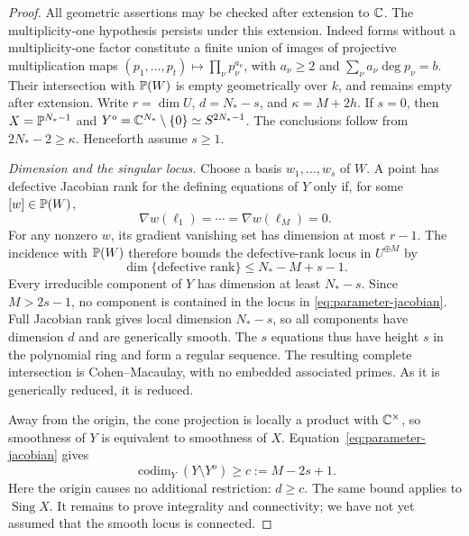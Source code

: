 \begin{proof}
All geometric assertions may be checked after extension to \(\mathbb C\).
The multiplicity-one hypothesis persists under this extension.
Indeed forms without a multiplicity-one factor constitute a finite
union of images of projective multiplication maps
\((p_1,\ldots,p_t)\mapsto\prod_\nu p_\nu^{a_\nu}\), with
\(a_\nu\ge2\) and \(\sum_\nu a_\nu\deg p_\nu=b\).
Their intersection with \(\mathbb P(W)\) is empty geometrically over \(k\),
and remains empty after extension.
Write \(r=\dim U\), \(d=N_*-s\), and \(\kappa=M+2h\).
If \(s=0\), then \(X=\mathbb P^{N_*-1}\) and
\(Y^o=\mathbb C^{N_*}\setminus\{0\}\simeq S^{2N_*-1}\).
The conclusions follow from \(2N_*-2\ge\kappa\).
Henceforth assume \(s\ge1\).

\emph{Dimension and the singular locus.}
Choose a basis \(w_1,\ldots,w_s\) of \(W\).  A point has defective
Jacobian rank for the defining equations of \(Y\) only if, for some
\([w]\in\mathbb P(W)\),
\[
 \nabla w(\ell_1)=\cdots=\nabla w(\ell_M)=0.
\]
For any nonzero \(w\), its gradient vanishing set has dimension at
most \(r-1\).  The incidence with \(\mathbb P(W)\) therefore bounds the
defective-rank locus in \(U^{\oplus M}\) by
\begin{equation}
 \dim\{\text{defective rank}\}\le N_*-M+s-1.
 \label{eq:parameter-jacobian}
\end{equation}
Every irreducible component of \(Y\) has dimension at least \(N_*-s\).
Since \(M>2s-1\), no component is contained in the locus in
\eqref{eq:parameter-jacobian}.  Full Jacobian rank gives local dimension
\(N_*-s\), so all components have dimension \(d\) and are generically
smooth.  The \(s\) equations thus have height \(s\) in the polynomial
ring and form a regular sequence.  The resulting complete intersection
is Cohen--Macaulay, with no embedded associated primes.  As it is
generically reduced, it is reduced.

Away from the origin, the cone projection is locally a product with
\(\mathbb C^\times\), so smoothness of \(Y\) is equivalent to smoothness of
\(X\).  Equation~\eqref{eq:parameter-jacobian} gives
\begin{equation}
 \operatorname{codim}_Y(Y\setminus Y^o)\ge c:=M-2s+1.
 \label{eq:parameter-omitted}
\end{equation}
Here the origin causes no additional restriction: \(d\ge c\).
The same bound applies to \(\operatorname{Sing}X\).
It remains to prove integrality and connectivity; we have not yet
assumed that the smooth locus is connected.


\end{proof}
